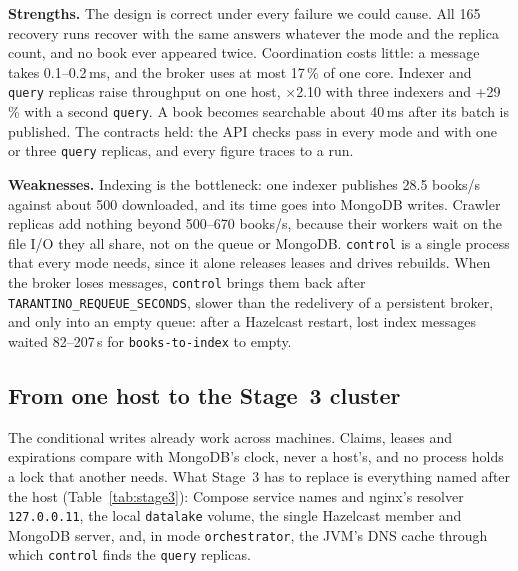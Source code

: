 \documentclass[11pt,a4paper]{article}
\newcommand{\code}[1]{\nolinkurl{#1}}
\newcommand{\mode}[1]{\code{#1}}
\begin{document}
\textbf{Strengths.} The design is correct under every failure we could cause. All 165 recovery runs recover with the
same answers whatever the mode and the replica count, and no book ever appeared twice. Coordination costs little: a
message takes 0.1--0.2\,ms, and the broker uses at most 17\,\% of one core. Indexer and \code{query} replicas raise
throughput on one host, $\times$2.10 with three indexers and +29\,\% with a second \code{query}. A book becomes
searchable about 40\,ms after its batch is published. The contracts held: the API checks pass in every mode and
with one or three \code{query} replicas, and every figure traces to a run.

\textbf{Weaknesses.} Indexing is the bottleneck: one indexer publishes 28.5 books/s against about 500 downloaded, and
its time goes into MongoDB writes. Crawler replicas add nothing beyond 500--670 books/s, because their workers wait on
the file I/O they all share, not on the queue or MongoDB. \code{control} is a single process that every mode needs,
since it alone releases leases and drives rebuilds. When the broker loses messages, \code{control} brings them back
after \code{TARANTINO_REQUEUE_SECONDS}, slower than the redelivery of a persistent broker, and only into an empty queue:
after a Hazelcast restart, lost index messages waited 82--207\,s for \code{books-to-index} to empty.

\subsection{From one host to the Stage~3 cluster}
\label{sec:stage3}

The conditional writes already work across machines. Claims, leases and expirations compare with MongoDB's clock,
never a host's, and no process holds a lock that another needs. What Stage~3 has to replace is everything named after
the host (Table~\ref{tab:stage3}): Compose service names and nginx's resolver \code{127.0.0.11}, the local
\code{datalake} volume, the single Hazelcast member and MongoDB server, and, in mode \mode{orchestrator}, the JVM's DNS
cache through which \code{control} finds the \code{query} replicas.
\end{document}
